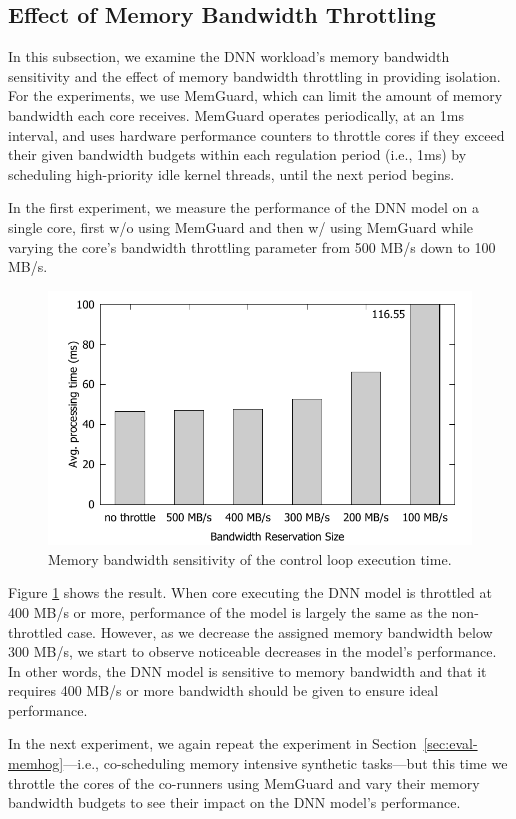 \subsection{Effect of Memory Bandwidth Throttling}

In this subsection, we examine the DNN workload's memory bandwidth
sensitivity and the effect of memory bandwidth throttling in providing
isolation. For the experiments, we use MemGuard\cite{Yun2013}, which 
can limit the amount of memory bandwidth each core receives. MemGuard
operates periodically, at an 1ms interval, and uses hardware
performance counters to throttle cores if they exceed their given
bandwidth budgets within each regulation period (i.e., 1ms) by
scheduling high-priority idle kernel threads, until the next period begins.


In the first experiment, we measure the performance of the DNN model
on a single core, first w/o using MemGuard and then w/
using MemGuard while varying the core's bandwidth throttling parameter
from 500 MB/s down to 100 MB/s.

\begin{figure}[h]
  \centering
  \includegraphics[width=.45\textwidth]{figs/memguard_multicore}
  \caption{ Memory bandwidth sensitivity of the control loop 
execution time. }
  \label{fig:memguard_multicore}
\end{figure}

Figure \ref{fig:memguard_multicore} shows the result. When core
executing the DNN model is throttled at 400 MB/s or more, performance
of the model is largely the same as the non-throttled case. However, as
we decrease the assigned memory bandwidth below 300 MB/s, we start to
observe noticeable decreases in the model's performance. In other
words, the DNN model is sensitive to memory bandwidth and that it
requires 400 MB/s or more bandwidth should be given to ensure ideal
performance.

In the next experiment, we again repeat the experiment in
Section~\ref{sec:eval-memhog}---i.e., co-scheduling memory intensive
synthetic tasks---but this time we
throttle the cores of the co-runners using MemGuard and vary their
memory bandwidth budgets to see their impact on the DNN model's 
performance.

